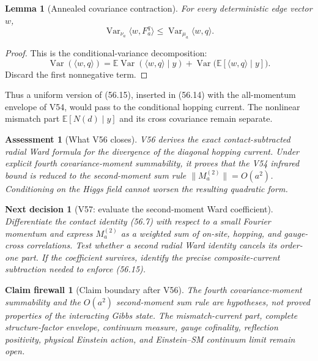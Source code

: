 \documentclass[11pt]{article}
\newtheorem{lemma}[theorem]{Lemma}
\newtheorem{firewall}[theorem]{Claim firewall}
\newtheorem{decision}[theorem]{Next decision}
\newtheorem{assessment}[theorem]{Assessment}
\theoremstyle{remark}
\begin{document}
\begin{lemma}[Annealed covariance contraction]
\label{lem:v17v56-conditioning}
For every deterministic edge vector \(w\),
\[
 \operatorname{Var}_{\nu_a}
 \langle w,F_a^q\rangle
 \leq
 \operatorname{Var}_{\mu_a}\langle w,q\rangle.   \tag{56.18}
\]
\end{lemma}

\begin{proof}
This is the conditional-variance decomposition:
\[
 \operatorname{Var}(\langle w,q\rangle)
 =
 \mathbb E\operatorname{Var}(\langle w,q\rangle\mid y)
 +\operatorname{Var}
 \bigl(\mathbb E[\langle w,q\rangle\mid y]\bigr).
\]
Discard the first nonnegative term.
\end{proof}

Thus a uniform version of (56.15), inserted in (56.14) with the
all-momentum envelope of V54, would pass to the conditional hopping
current.  The nonlinear mismatch part
\(\mathbb E[N(d)\mid y]\) and its cross covariance remain separate.

\begin{assessment}[What V56 closes]
\label{ass:v17v56-status}
V56 derives the exact contact-subtracted radial Ward formula for the
divergence of the diagonal hopping current.  Under explicit fourth
covariance-moment summability, it proves that the V54 infrared bound
is reduced to the second-moment sum rule
\(\|M_a^{(2)}\|=O(a^2)\).  Conditioning on the Higgs field cannot
worsen the resulting quadratic form.
\end{assessment}

\begin{decision}[V57: evaluate the second-moment Ward coefficient]
\label{dec:v17v56-next}
Differentiate the contact identity (56.7) with respect to a small
Fourier momentum and express \(M_a^{(2)}\) as a weighted sum of
on-site, hopping, and gauge-cross correlations.  Test whether a second
radial Ward identity cancels its order-one part.  If the coefficient
survives, identify the precise composite-current subtraction needed
to enforce (56.15).
\end{decision}

\begin{firewall}[Claim boundary after V56]
\label{fire:v17v56}
The fourth covariance-moment summability and the \(O(a^2)\)
second-moment sum rule are hypotheses, not proved properties of the
interacting Gibbs state.  The mismatch-current part, complete
structure-factor envelope, continuum measure, gauge cofinality,
reflection positivity, physical Einstein action, and Einstein--SM
continuum limit remain open.
\end{firewall}
\end{document}
